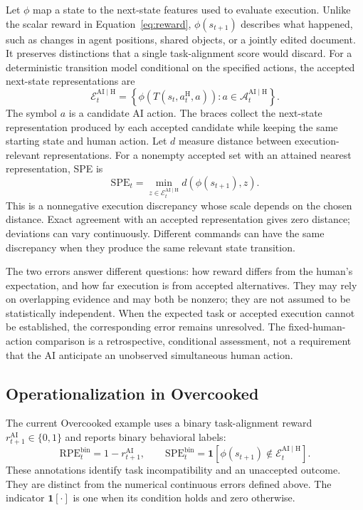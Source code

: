 \documentclass[11pt]{article}
\newcommand{\AIH}{\mathrm{AI}\mid\mathrm{H}}
\newcommand{\RPE}{\mathrm{RPE}}
\newcommand{\SPE}{\mathrm{SPE}}
\newcommand{\At}{\mathcal{A}_t^{\AIH}}
\newcommand{\Et}{\mathcal{E}_t^{\AIH}}
\newcommand{\ind}{\mathbf{1}}
\begin{document}
Let $\phi$ map a state to the next-state features used to evaluate execution.
Unlike the scalar reward in Equation~\eqref{eq:reward}, $\phi(s_{t+1})$
describes what happened, such as changes in agent positions, shared objects,
or a jointly edited document. It preserves distinctions that a single
task-alignment score would discard. For a deterministic transition model
conditional on the specified actions, the accepted next-state
representations are
\begin{equation}
 \Et
 =\left\{\phi\!\left(T(s_t,a_t^{\mathrm H},a)\right)
          :a\in\At\right\}.
 \label{eq:expected}
\end{equation}
The symbol $a$ is a candidate AI action. The braces collect the next-state
representation produced by each accepted candidate while keeping the same
starting state and human action. Let $d$ measure distance between
execution-relevant representations. For a nonempty accepted set with an
attained nearest representation, SPE is
\begin{equation}
 \boxed{\SPE_t=\min_{z\in\Et}d\!\left(\phi(s_{t+1}),z\right).}
 \label{eq:spe}
\end{equation}
This is a nonnegative execution discrepancy whose scale depends on the
chosen distance. Exact agreement with an accepted representation gives zero
distance; deviations can vary continuously. Different commands can have the
same discrepancy when they produce the same relevant state transition.

The two errors answer different questions: how reward differs from the
human's expectation, and how far execution is from accepted alternatives.
They may rely on overlapping evidence and may both be nonzero; they are not
assumed to be statistically independent. When the expected task or accepted
execution cannot be established, the corresponding error remains
unresolved. The fixed-human-action comparison is a retrospective,
conditional assessment, not a requirement that the AI anticipate an
unobserved simultaneous human action.

\subsection{Operationalization in Overcooked}
The current Overcooked example uses a binary task-alignment reward
$r_{t+1}^{\mathrm{AI}}\in\{0,1\}$ and reports binary behavioral labels:
\begin{equation}
 \RPE_t^{\mathrm{bin}}=1-r_{t+1}^{\mathrm{AI}},\qquad
 \SPE_t^{\mathrm{bin}}=\ind\!\left[\phi(s_{t+1})\notin\Et\right].
\end{equation}
These annotations identify task incompatibility and an unaccepted outcome.
They are distinct from the numerical continuous errors defined above.
The indicator $\ind[\cdot]$ is one when its condition holds and zero otherwise.
\end{document}
